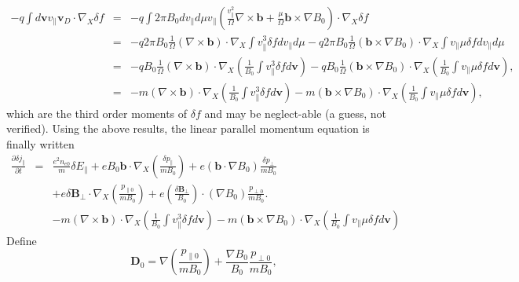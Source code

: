 \documentclass{article}
\begin{document}
\begin{eqnarray}
  - q \int d\mathbf{v}v_{\parallel} \mathbf{v}_D \cdot \nabla_X \delta f & = &
  - q \int 2 \pi B_0 d v_{\parallel} d \mu v_{\parallel} \left(
  \frac{v_{\parallel}^2}{\Omega} \nabla \times \mathbf{b}+ \frac{\mu}{\Omega}
  \mathbf{b} \times \nabla B_0 \right) \cdot \nabla_X \delta f \nonumber\\
  & = & - q 2 \pi B_0  \frac{1}{\Omega} (\nabla \times \mathbf{b}) \cdot
  \nabla_X \int v_{\parallel}^3 \delta f d v_{\parallel} d \mu - q 2 \pi B_0
  \frac{1}{\Omega} (\mathbf{b} \times \nabla B_0) \cdot \nabla_X \int
  v_{\parallel} \mu \delta f d v_{\parallel} d \mu \nonumber\\
  & = & - q B_0  \frac{1}{\Omega} (\nabla \times \mathbf{b}) \cdot \nabla_X
  \left( \frac{1}{B_0} \int v_{\parallel}^3 \delta f d\mathbf{v} \right) - q
  B_0 \frac{1}{\Omega} (\mathbf{b} \times \nabla B_0) \cdot \nabla_X \left(
  \frac{1}{B_0} \int v_{\parallel} \mu \delta f d\mathbf{v} \right),
  \nonumber\\
  & = & - m (\nabla \times \mathbf{b}) \cdot \nabla_X \left( \frac{1}{B_0}
  \int v_{\parallel}^3 \delta f d\mathbf{v} \right) - m (\mathbf{b} \times
  \nabla B_0) \cdot \nabla_X \left( \frac{1}{B_0} \int v_{\parallel} \mu
  \delta f d\mathbf{v} \right), 
\end{eqnarray}
which are the third order moments of $\delta f$ and may be neglect-able (a
guess, not verified). Using the above results, the linear parallel momentum
equation is finally written
\begin{eqnarray}
  \frac{\partial \delta j_{\parallel}}{\partial t} & = & \frac{e^2 n_{e 0}}{m}
  \delta E_{\parallel} + e B_0 \mathbf{b} \cdot \nabla_X \left( \frac{\delta
  p_{\parallel}}{m B_0} \right) + e (\mathbf{b} \cdot \nabla B_0) \frac{\delta
  p_{\perp}}{m B_0} \nonumber\\
  &  & + e \delta \mathbf{B}_{\perp} \cdot \nabla_X \left( \frac{p_{\parallel
  0}}{m B_0} \right) + e \left( \frac{\delta \mathbf{B}_{\perp}}{B_0} \right)
  \cdot (\nabla B_0) \frac{p_{\perp 0}}{m B_0} . \nonumber\\
  &  & - m (\nabla \times \mathbf{b}) \cdot \nabla_X \left( \frac{1}{B_0}
  \int v_{\parallel}^3 \delta f d\mathbf{v} \right) - m (\mathbf{b} \times
  \nabla B_0) \cdot \nabla_X \left( \frac{1}{B_0} \int v_{\parallel} \mu
  \delta f d\mathbf{v} \right)  \label{17-5-19-2}
\end{eqnarray}
Define
\begin{equation}
  \mathbf{D}_0 = \nabla \left( \frac{p_{\parallel 0}}{m B_0} \right) +
  \frac{\nabla B_0}{B_0} \frac{p_{\perp 0}}{m B_0},
\end{equation}
\end{document}
